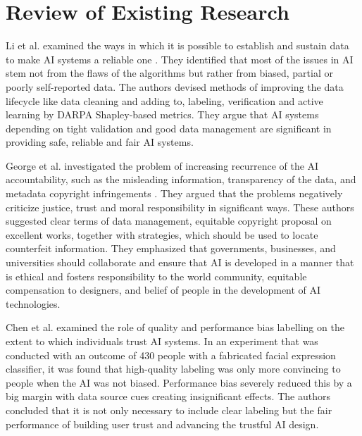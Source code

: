 




\section{Review of Existing Research}


Li et al. examined the ways in which it is possible to establish and sustain data to make AI systems a reliable one \cite{Liang2024Traceability}. They identified that most of the issues in AI stem not from the flaws of the algorithms but rather from biased, partial or poorly self-reported data. The authors devised methods of improving the data lifecycle like data cleaning and adding to, labeling, verification and active learning by DARPA Shapley-based metrics. They argue that AI systems depending on tight validation and good data management are significant in providing safe, reliable and fair AI systems.
 
\vspace{1em} 
George et al. \cite{George2024} investigated the problem of increasing recurrence of the AI accountability, such as the misleading information, transparency of the data, and metadata copyright infringements \cite{George2024}. They argued that the problems negatively criticize justice, trust and moral responsibility in significant ways. These authors suggested clear terms of data management, equitable copyright proposal on excellent works, together with strategies, which should be used to locate counterfeit information. They emphasized that governments, businesses, and universities should collaborate and ensure that AI is developed in a manner that is ethical and fosters responsibility to the world community, equitable compensation to designers, and belief of people in the development of AI technologies.

\vspace{1em} 
Chen et al. \cite{ChenSundar2023} examined the role of quality and performance bias labelling on the extent to which individuals trust AI systems\cite{ChenSundar2023}. In an experiment that was conducted with an outcome of 430 people with a fabricated facial expression classifier, it was found that high-quality labeling was only more convincing to people when the AI was not biased. Performance bias severely reduced this by a big margin with data source cues creating insignificant effects. The authors concluded that it is not only necessary to include clear labeling but the fair performance of building user trust and advancing the trustful AI design.

